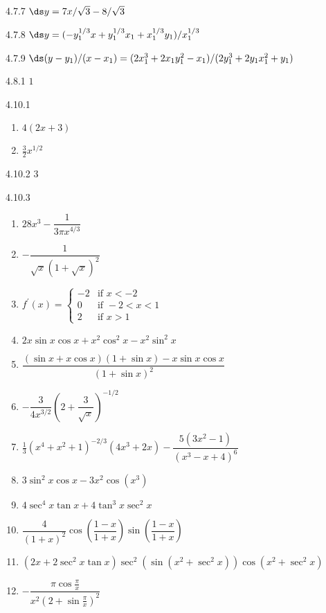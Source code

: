 \begin{Answer}{4.7.7}
	$\ds y=7x/\sqrt3-8/\sqrt3$
\end{Answer}
\begin{Answer}{4.7.8}
	$\ds y=(-y_1^{1/3}x+y_1^{1/3}x_1+x_1^{1/3}y_1)/x_1^{1/3}$
\end{Answer}
\begin{Answer}{4.7.9}
	$\ds (y-y_1)/(x-x_1)=(2x_1^3+2x_1y_1^2-x_1)/(2y_1^3+2y_1x_1^2+y_1)$
\end{Answer}
\begin{Answer}{4.8.1}
	$1$
\end{Answer}
\begin{Answer}{4.10.1}
\begin{enumerate}
	\item	$4(2x+3)$
	\item	$\frac{3}{2}x^{1/2}$
\end{enumerate}
\end{Answer}
\begin{Answer}{4.10.2}
	3
\end{Answer}
\begin{Answer}{4.10.3}
\begin{enumerate}
	\item	$28x^3-\dfrac{1}{3\pi x^{4/3}}$
	\item	$-\dfrac{1}{\sqrt{x}(1+\sqrt{x})^2}$
	\item	$f^{\prime}(x)=\left\{
	\begin{array}{ll}
	-2 & \text{if }x<-2 \\
	0 & \text{if }-2<x<1 \\
	2 & \text{if }x>1%
	\end{array}%
	\right. $
	\item	$2x\sin x\cos x+x^2\cos^2 x-x^2\sin^2 x$
	\item	$\dfrac{(\sin x+x\cos x)(1+\sin x)-x\sin x\cos x}{(1+\sin x)^2}$
	\item	$-\dfrac{3}{4x^{3/2}}\left(2+\dfrac{3}{\sqrt{x}}\right)^{-1/2}$
	\item	$\frac{1}{3}(x^4+x^2+1)^{-2/3}(4x^3+2x)-\dfrac{5(3x^2-1)}{(x^3-x+4)^6}$
	\item	$3\sin^2 x\cos x-3x^2\cos(x^3)$
	\item	$4\sec^4 x\tan x + 4\tan^3 x\sec^2 x$
	\item	$\dfrac{4}{(1+x)^2}\cos\left(\dfrac{1-x}{1+x}\right)\sin\left(\dfrac{1-x}{1+x}\right)$
	\item	$(2x+2\sec^2 x\tan x)\sec^2(\sin(x^2+\sec^2 x))\cos(x^2+\sec^2 x)$
	\item	$-\dfrac{\pi\cos\frac{\pi}{x}}{x^2(2+\sin\frac{\pi}{x})^2}$
\end{enumerate}
\end{Answer}
